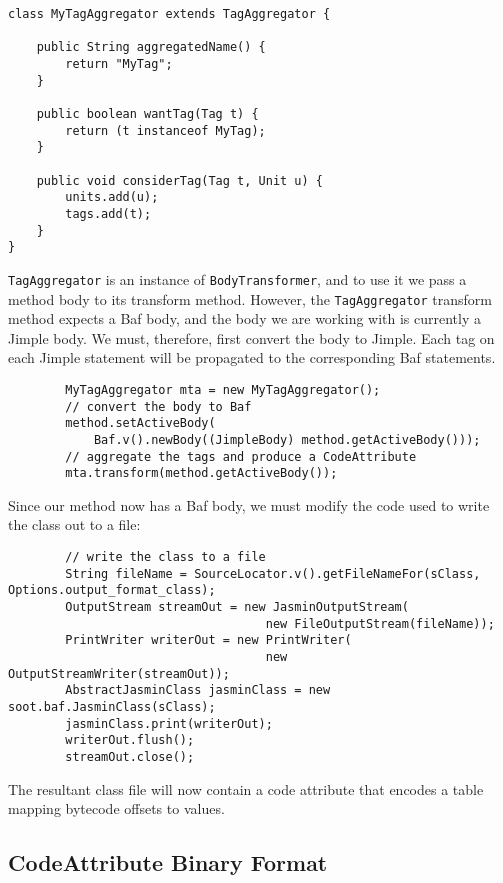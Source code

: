 \documentclass{article}
\begin{document}
\begin{verbatim}
class MyTagAggregator extends TagAggregator {

    public String aggregatedName() {
        return "MyTag";
    }

    public boolean wantTag(Tag t) {
        return (t instanceof MyTag);
    }

    public void considerTag(Tag t, Unit u) {
        units.add(u);
        tags.add(t);
    }
}
\end{verbatim}

{\tt TagAggregator} is an instance of {\tt BodyTransformer}, and to use it we 
pass a method body to its transform method. However, the {\tt TagAggregator} 
transform method expects a Baf body, and the body we are working with is 
currently a Jimple body. We must, therefore, first convert the body to Jimple. 
Each tag on each Jimple statement will be propagated to the corresponding Baf 
statements.

\begin{verbatim}
        MyTagAggregator mta = new MyTagAggregator();
        // convert the body to Baf
        method.setActiveBody(
            Baf.v().newBody((JimpleBody) method.getActiveBody()));
        // aggregate the tags and produce a CodeAttribute
        mta.transform(method.getActiveBody());
\end{verbatim}

Since our method now has a Baf body, we must modify the code used to write the 
class out to a file:

\begin{verbatim}
        // write the class to a file
        String fileName = SourceLocator.v().getFileNameFor(sClass, Options.output_format_class);
        OutputStream streamOut = new JasminOutputStream(
                                    new FileOutputStream(fileName));
        PrintWriter writerOut = new PrintWriter(
                                    new OutputStreamWriter(streamOut));
        AbstractJasminClass jasminClass = new soot.baf.JasminClass(sClass);
        jasminClass.print(writerOut);
        writerOut.flush();
        streamOut.close();
\end{verbatim}

The resultant class file will now contain a code attribute that encodes a table
mapping bytecode offsets to values.

\subsection{CodeAttribute Binary Format}
\end{document}
